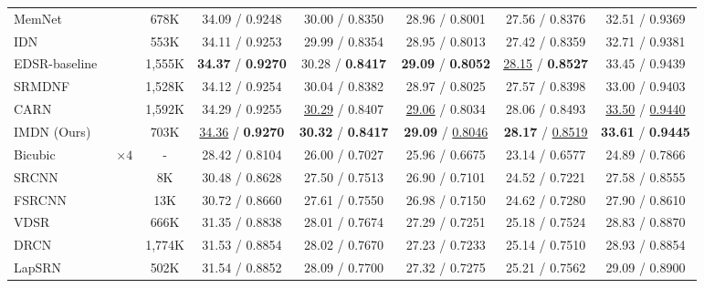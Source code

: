 \documentclass[sigconf]{acmart}
\begin{document}
\begin{table*}[htpb]
\begin{tabular}{|l|c|c|c|c|c|c|c|}
		MemNet~\cite{MemNet} &  & 678K & 34.09 / 0.9248 & 30.00 / 0.8350 & 28.96 / 0.8001 & 27.56 / 0.8376 & 32.51 / 0.9369\\
		
		IDN~\cite{IDN} &  & 553K & 34.11 / 0.9253 & 29.99 / 0.8354 & 28.95 / 0.8013 & 27.42 / 0.8359 & 32.71 / 0.9381 \\
		
		EDSR-baseline~\cite{EDSR} &  & 1,555K & \textbf{34.37} / \textbf{0.9270} & 30.28 / \textbf{0.8417} & \textbf{29.09} / \textbf{0.8052} & \underline{28.15} / \textbf{0.8527} & 33.45 / 0.9439 \\
		
		SRMDNF~\cite{SRMDNF} &  & 1,528K & 34.12 / 0.9254 & 30.04 / 0.8382 & 28.97 / 0.8025 & 27.57 / 0.8398 & 33.00 / 0.9403 \\
		
		CARN~\cite{CARN} &  & 1,592K & 34.29 / 0.9255 & \underline{30.29} / 0.8407 & \underline{29.06} / 0.8034 & 28.06 / 0.8493 & \underline{33.50} / \underline{0.9440} \\
		
		IMDN (Ours) &  & 703K & \underline{34.36} / \textbf{0.9270} & \textbf{30.32} / \textbf{0.8417} & \textbf{29.09} / \underline{0.8046} & \textbf{28.17} / \underline{0.8519} & \textbf{33.61} / \textbf{0.9445} \\
		
		\hline
		\hline
Bicubic & \multirow{13}{*}{$\times 4$} & - & 28.42 / 0.8104 & 26.00 / 0.7027 & 25.96 / 0.6675 & 23.14 / 0.6577 & 24.89 / 0.7866 \\
		
		SRCNN~\cite{SRCNN} &  & 8K & 30.48 / 0.8628 & 27.50 / 0.7513 & 26.90 / 0.7101 & 24.52 / 0.7221 & 27.58 / 0.8555 \\
		
		FSRCNN~\cite{FSRCNN} &  & 13K & 30.72 / 0.8660 & 27.61 / 0.7550 & 26.98 / 0.7150 & 24.62 / 0.7280 &  27.90 / 0.8610 \\
		
		VDSR~\cite{VDSR} &  & 666K & 31.35 / 0.8838 & 28.01 / 0.7674 & 27.29 / 0.7251 & 25.18 / 0.7524 & 28.83 / 0.8870 \\
		
		DRCN~\cite{DRCN} &  & 1,774K & 31.53 / 0.8854 & 28.02 / 0.7670 & 27.23 / 0.7233 & 25.14 / 0.7510 & 28.93 / 0.8854 \\
		
		LapSRN~\cite{LapSRN} &  & 502K & 31.54 / 0.8852 & 28.09 / 0.7700 & 27.32 / 0.7275 & 25.21 / 0.7562 & 29.09 / 0.8900 \\
		

\end{tabular}
\end{table*}
\end{document}

